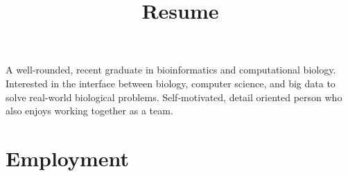 \documentclass[11pt,a4paper,sans]{moderncv}        %
\title{Resume }                               %
\begin{document}
\makecvtitle

\small{A well-rounded, recent graduate in bioinformatics and computational biology. Interested in the interface between biology, computer science, and big data to solve real-world biological problems. Self-motivated, detail oriented person who also enjoys working together as a team.}


\section{Employment}

\vspace{6pt}
\end{document}
